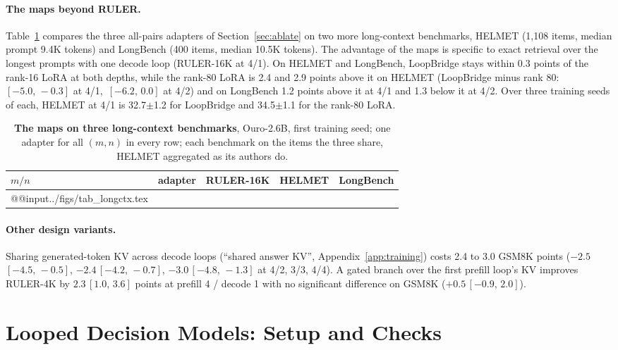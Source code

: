 \documentclass[11pt]{article}
\newcommand{\ci}[2]{\,{\scriptsize\ensuremath{[#1,\,#2]}}}
\begin{document}
\paragraph{The maps beyond RULER.} Table~\ref{tab:longctx} compares the three all-pairs adapters of
Section~\ref{sec:ablate} on two more long-context benchmarks, HELMET (1,108 items, median prompt 9.4K tokens) and
LongBench (400 items, median 10.5K tokens). The advantage of the maps is specific to exact retrieval over the longest
prompts with one decode loop (RULER-16K at 4/1). On HELMET and LongBench, LoopBridge stays within 0.3 points of the
rank-16 LoRA at both depths, while the rank-80 LoRA is 2.4 and 2.9 points above it on HELMET (LoopBridge minus rank 80:
\ci{-5.0}{-0.3} at 4/1, \ci{-6.2}{0.0} at 4/2) and on LongBench 1.2 points above it at 4/1 and 1.3 below it at 4/2. Over three training seeds of each, HELMET at 4/1 is
32.7$\pm$1.2 for LoopBridge and 34.5$\pm$1.1 for the rank-80 LoRA.

\begin{table}[h]
\centering\footnotesize
\setlength\tabcolsep{3pt}
\begin{tabular}{@{}llccc@{}}
\toprule
$m/n$ & adapter & RULER-16K & HELMET & LongBench \\
\midrule
\csname @@input\endcsname ../figs/tab_longctx.tex
\bottomrule
\end{tabular}
\caption{\textbf{The maps on three long-context benchmarks}, Ouro-2.6B, first training seed; one adapter for all
$(m,n)$ in every row; each benchmark on the items the three share, HELMET aggregated as its authors do.}
\label{tab:longctx}
\end{table}

\paragraph{Other design variants.} Sharing generated-token KV across decode loops (``shared answer KV'',
Appendix~\ref{app:training}) costs 2.4 to 3.0 GSM8K points ($-2.5$\ci{-4.5}{-0.5}, $-2.4$\ci{-4.2}{-0.7},
$-3.0$\ci{-4.8}{-1.3} at 4/2, 3/3, 4/4). A gated branch over the first prefill loop's KV improves RULER-4K by
$2.3$\ci{1.0}{3.6} points at prefill 4 / decode 1 with no significant difference on GSM8K ($+0.5$\ci{-0.9}{2.0}).

\FloatBarrier
\section{Looped Decision Models: Setup and Checks}
\label{app:lev}
\end{document}
